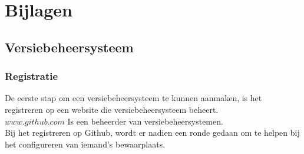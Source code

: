 \documentclass[12pt]{article}
\begin{document}
		\newpage
		
		\newpage
		\listoffigures
		\listoftables
		\newpage
		\printindex	
			
		\section{Bijlagen}\label{Bijlagen}
			\subsection{Versiebeheersysteem}\label{Git}
				\subsubsection{Registratie}
					De eerste stap om een versiebeheersysteem te kunnen aanmaken, is het registreren op een website die versiebeheersysteem beheert.\\
					$www.github.com$ Is een beheerder van versiebeheersystemen.\\
					Bij het registreren op Github, wordt er nadien een ronde gedaan om te helpen bij het configureren van iemand's bewaarplaats.
					
\end{document}
